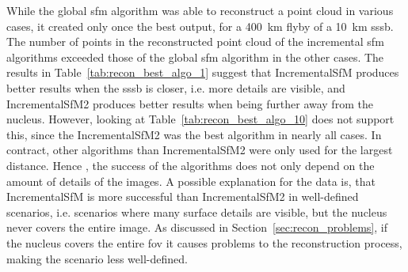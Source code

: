 \begin{table}[htb]
    \centering
    \caption{\Gls{sfm} algorithm with most reconstructed points for each scenario with a \SI{10}{\kilo\meter} \gls{sssb}. Seq1 refers to algorithm IncrementalSfM, Seq2 refers to algorithm IncrementalSfM2 and Glob refers to algorithm GlobalSfM.}
    \label{tab:recon_best_algo_10}
\end{table}


While the global \gls{sfm} algorithm was able to reconstruct a point cloud in various cases, it created only once the best output, for a \SI{400}{\kilo\meter} flyby of a \SI{10}{\kilo\meter} \gls{sssb}. The number of points in the reconstructed point cloud of the incremental \gls{sfm} algorithms exceeded those of the global \gls{sfm} algorithm in the other cases.
The results in Table~\ref{tab:recon_best_algo_1} suggest that IncrementalSfM produces better results when the \gls{sssb} is closer, i.e. more details are visible, and IncrementalSfM2 produces better results when being further away from the nucleus. However, looking at Table~\ref{tab:recon_best_algo_10} does not support this, since the IncrementalSfM2 was the best algorithm in nearly all cases. In contract, other algorithms than IncrementalSfM2 were only used for the largest distance. Hence , the success of the algorithms does not only depend on the amount of details of the images. A possible explanation for the data is, that IncrementalSfM is more successful than IncrementalSfM2 in well-defined scenarios, i.e. scenarios where many surface details are visible, but the nucleus never covers the entire image. As discussed in Section~\ref{sec:recon_problems}, if the nucleus covers the entire \gls{fov} it causes problems to the reconstruction process, making the scenario less well-defined.